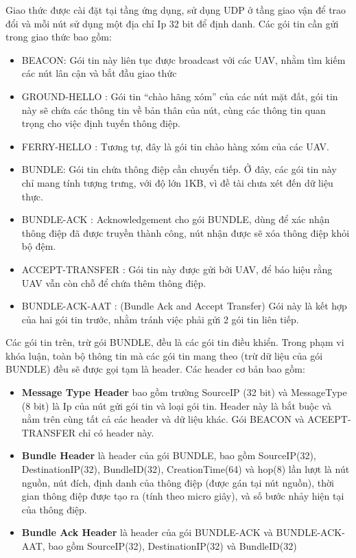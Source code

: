 \documentclass[a4paper]{article}
\begin{document}
Giao thức được cài đặt tại tầng ứng dụng, sử dụng UDP ở tầng giao vận để trao đổi và mỗi nút sử dụng một địa chỉ Ip 32 bit để định danh. Các gói tin cần gửi trong giao thức bao gồm:
\begin{itemize}
  \item BEACON: Gói tin này liên tục được broadcast vởi các UAV, nhằm tìm kiếm các nút lân cận và bắt đầu giao thức
  \item GROUND-HELLO : Gói tin ``chào hãng xóm'' của các nút mặt đất, gói tin này sẽ chứa các thông tin về bản thân của nút, cùng các thông tin quan trọng cho việc định tuyến thông điệp.
  \item FERRY-HELLO : Tương tự, đây là gói tin chào hàng xóm của các UAV.
  \item BUNDLE: Gói tin chứa thông điệp cần chuyển tiếp. Ở đây, các gói tin này chỉ mang tính tượng trưng, với độ lớn 1KB, vì đề tài chưa xét đến dữ liệu thực.
  \item BUNDLE-ACK : Acknowledgement cho gói BUNDLE, dùng để xác nhận thông điệp đã được truyền thành công, nút nhận được sẽ xóa thông điệp khỏi bộ đệm.
  \item ACCEPT-TRANSFER : Gói tin này được gửi bởi UAV, để báo hiệu rằng UAV vẫn còn chỗ để chứa thêm thông điệp.
  \item BUNDLE-ACK-AAT : (Bundle Ack and Accept Transfer) Gói này là kết hợp của hai gói tin trước, nhằm tránh việc phải gửi 2 gói tin liên tiếp.
\end{itemize}

Các gói tin trên, trừ gói BUNDLE, đều là các gói tin điều khiển. Trong phạm vi khóa luận, toàn bộ thông tin mà các gói tin mang theo (trừ dữ liệu của gói BUNDLE) đều sẽ được gọi tạm là header. Các header cơ bản bao gồm:
\begin{itemize}
  \item {\bfseries Message Type Header} bao gồm trường SourceIP (32 bit) và MessageType (8 bit) là Ip của nút gửi gói tin và loại gói tin. Header này là bắt buộc và nằm trên cùng tất cả các header và dữ liệu khác. Gói BEACON và ACEEPT-TRANSFER chỉ có header này.
  \item {\bfseries Bundle Header} là header của gói BUNDLE, bao gồm SourceIP(32), DestinationIP(32), BundleID(32), CreationTime(64) và hop(8) lần lượt là nút nguồn, nút đích, định danh của thông điệp (được gán tại nút nguồn), thời gian thông điệp được tạo ra (tính theo micro giây), và số bước nhảy hiện tại của thông điệp.
  \item {\bfseries Bundle Ack Header} là header của gói BUNDLE-ACK và BUNDLE-ACK-AAT, bao gồm SourceIP(32), DestinationIP(32) và BundleID(32)
\end{itemize}
\end{document}
